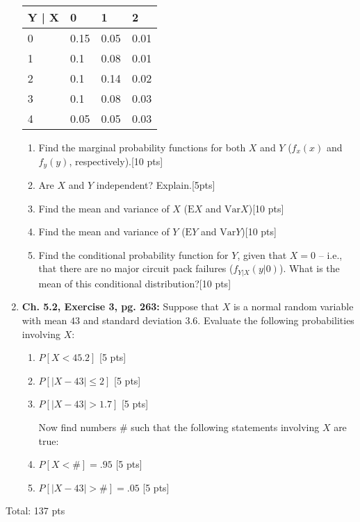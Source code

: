 \documentclass[11pt]{article}\usepackage[]{graphicx}\usepackage[]{color}
\begin{document}
\begin{enumerate}
 \begin{table}[h!]
     \centering
     \begin{tabular}{|l|p{1cm}|p{1cm}|p{1cm}|}
     \hline
         \textbf{Y | X}& \textbf{0} & \textbf{1}  & \textbf{2}  \\\hline \hline
     0 & 0.15  & 0.05  & 0.01  \\
     \hline
     1 & 0.1   & 0.08  &0.01  \\
     \hline
     2 & 0.1   & 0.14  & 0.02  \\
     \hline
     3 & 0.1   & 0.08  & 0.03  \\
     \hline
     4 & 0.05  & 0.05  & 0.03  \\
     \hline
     \end{tabular}
  \end{table}
          \begin{enumerate}
            \item Find the marginal probability functions for both $X$ and $Y$ ($f_x(x)$ and $f_y(y)$, respectively).[10 pts]
            \item Are $X$ and $Y$ independent? Explain.[5pts]
            \item Find the mean and variance of $X$ ($\text{E}X$ and $\text{Var}X$)[10 pts]
            \item Find the mean and variance of $Y$ ($\text{E}Y$ and $\text{Var}Y$)[10 pts]
            \item Find the conditional probability function for $Y$, given that $X = 0$ -- i.e., that there are no major circuit pack failures ($f_{Y|X}(y|0)$). What is the mean of this conditional distribution?[10 pts]
            \end{enumerate}
  
  \item \textbf{Ch. 5.2, Exercise 3, pg. 263:} Suppose that $X$ is a normal random variable with mean $43$ and standard deviation $3.6$. Evaluate the following probabilities involving $X$:
      \begin{enumerate}
              \item $P[X < 45.2]$ [5 pts]
              \item $P[|X - 43| \le 2]$ [5 pts]
              \item $P[|X - 43| > 1.7]$  [5 pts]
      
    Now find numbers \# such that the following statements involving $X$ are true:
    
              \item $P[X < \#] = .95$ [5 pts]
              \item $P[|X - 43| > \#] = .05$ [5 pts]

      \end{enumerate}

\end{enumerate}
Total: 137 pts
\end{document}
